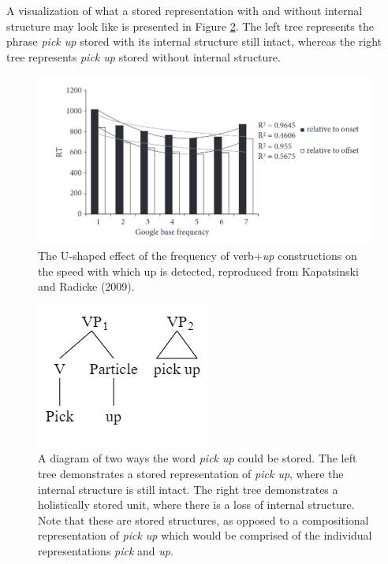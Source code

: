 \documentclass[
  man,floatsintext]{apa6}
\begin{document}
A visualization of what a stored representation with and without internal structure may look like is presented in Figure \ref{fig:lossInternal}. The left tree represents the phrase \emph{pick up} stored with its internal structure still intact, whereas the right tree represents \emph{pick up} stored without internal structure.



\begin{figure}

{\centering \includegraphics[width=0.7\linewidth]{Figures/kapatsinskiradicke_graph} 

}

\caption{The U-shaped effect of the frequency of verb+\emph{up} constructions on the speed with which up is detected, reproduced from Kapatsinski and Radicke (2009).}\label{fig:kapatsinskiplot}
\end{figure}



\begin{figure}

{\centering \includegraphics[width=0.3\linewidth]{Figures/syntax_tree} 

}

\caption{A diagram of two ways the word \emph{pick up} could be stored. The left tree demonstrates a stored representation of \emph{pick up}, where the internal structure is still intact. The right tree demonstrates a holistically stored unit, where there is a loss of internal structure. Note that these are stored structures, as opposed to a compositional representation of \emph{pick up} which would be comprised of the individual representations \emph{pick} and \emph{up}.}\label{fig:lossInternal}
\end{figure}
\end{document}
